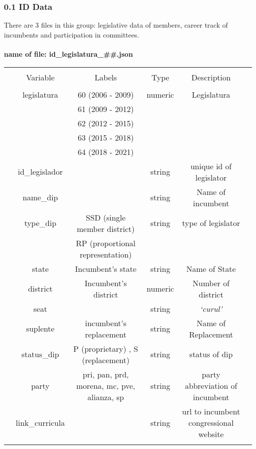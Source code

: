 \documentclass{article}
\begin{document}
\subsubsection*{0.1 ID Data}
There are 3 files in this group: legislative data of members, career track of incumbents and participation in committees.\\ 
\\
\textbf{name of file: id\_legislatura\_\#\#.json  } 
\begin{table}[!htbp] \centering 
	\begin{tabular}{@{\extracolsep{5pt}} cccccc} 
		\\[-1.8ex]\hline 
		\hline \\[-1.8ex] 
		& Variable & Labels  & Type & Description \\ 
		\hline \\[-1.8ex] 
		& legislatura  &60  (2006 - 2009) & numeric  & Legislatura   \\ 
		& &61 (2009 - 2012) & & \\
		& & 62 (2012 - 2015) & & \\
		& & 63 (2015 - 2018) & & \\
		& & 64 (2018 - 2021) & & \\
		& id\_legislador  &   & string  & unique id of legislator   \\ 
		& name\_dip  &   & string  & Name of incumbent  \\ 
		& type\_dip  &  SSD (single member district) & string  & type of legislator   \\ 
		& & RP (proportional representation) & & \\
		& state  & Incumbent's state  & string  & Name of State   \\ 
		& district  & Incumbent's district  & numeric  & Number of district   \\ 
		& seat  &  & string  &\textit{ `curul'   }\\ 
		& suplente  &  incumbent's replacement & string  & Name of Replacement   \\ 
		& status\_dip  & P (proprietary) , S (replacement)  &  string &  status of dip\\ 
		& party  & pri, pan, prd, morena, mc, pve, alianza, sp  & string  & party abbreviation of incumbent   \\ 
		& link\_curricula  &   & string  & url to incumbent congressional website   \\ 
		
		\hline \\[-1.8ex] 
	\end{tabular} 
\end{table} 
\end{document}
